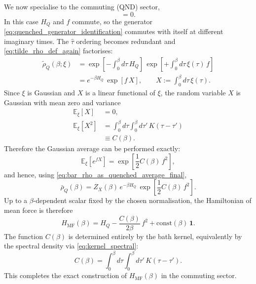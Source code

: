 We now specialise to the commuting (QND) sector,
\begin{equation}
    [H_Q,f]=0.
    \label{eq:commuting_here}
\end{equation}
In this case $H_Q$ and $f$ commute, so the generator \eqref{eq:quenched_generator_identification}
commutes with itself at different imaginary times. The $\hat\tau$ ordering becomes
redundant and \eqref{eq:tilde_rho_def_again} factorises:
\begin{align}
    \tilde\rho_Q(\beta;\xi)
    &=
    \exp\!\left[-\int_0^\beta d\tau\,H_Q\right]\,
    \exp\!\left[+\int_0^\beta d\tau\,\xi(\tau)\,f\right]
    \nonumber\\
    &=
    e^{-\beta H_Q}\,
    \exp\!\left[f\,X\right],
    \qquad
    X:=\int_0^\beta d\tau\,\xi(\tau).
    \label{eq:tilde_rho_commuting_factorised}
\end{align}
Since $\xi$ is Gaussian and $X$ is a linear functional of $\xi$, the random variable
$X$ is Gaussian with mean zero and variance
\begin{align}
    \mathbb E_\xi[X]&=0, \nonumber\\
    \mathbb E_\xi[X^2]
    &= \int_0^\beta d\tau\int_0^\beta d\tau'\,K(\tau-\tau')
    \nonumber\\
    &\equiv C(\beta).
    \label{eq:Cbeta_def}
\end{align}
Therefore the Gaussian average can be performed exactly:
\begin{equation}
    \mathbb E_\xi\!\left[e^{f X}\right]
    =
    \exp\!\left[\frac{1}{2}C(\beta)\,f^2\right],
    \label{eq:gaussian_average_resummed}
\end{equation}
and hence, using \eqref{eq:bar_rho_as_quenched_average_final},
\begin{equation}
    \bar\rho_Q(\beta)
    =
    Z_X(\beta)\,e^{-\beta H_Q}\,\exp\!\left[\frac{1}{2}C(\beta)\,f^2\right].
    \label{eq:bar_rho_commuting_closed}
\end{equation}
Up to a $\beta$-dependent scalar fixed by the chosen normalisation, the Hamiltonian
of mean force is therefore
\begin{equation}
    H_{\mathrm{MF}}(\beta)
    =
    H_Q
    -\frac{C(\beta)}{2\beta}\,f^2
    +\mathrm{const}(\beta)\,\mathbf 1.
    \label{eq:HMF_commuting_final}
\end{equation}
The function $C(\beta)$ is determined entirely by the bath kernel, equivalently by
the spectral density via \eqref{eq:kernel_spectral}:
\begin{equation}
    C(\beta)=\int_0^\beta d\tau\int_0^\beta d\tau'\,K(\tau-\tau').
    \label{eq:Cbeta_kernel_moments}
\end{equation}
This completes the exact construction of $H_{\mathrm{MF}}(\beta)$ in the commuting sector.
